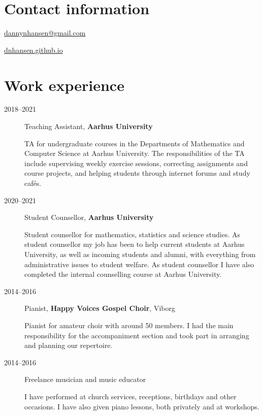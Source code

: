 \documentclass[article, a4paper, 11pt, oneside]{memoir}
\title{\doctitle}
\author{\docauthor}
\makeatletter
\newcommand{\myitem}[3]{\item[#1] #2 \par \small #3 \par\normalsize}
\renewcommand{\maketitle}{%
  \begin{center}
  {\huge\@author}\par
  \vspace*{1em}
  {\Large\itshape\@title}
  \end{center}
}
\makeatother
\begin{document}
\maketitle

\section{Contact information}

\begin{description}[itemsep=0pt]
    \item[Email] \href{mailto:dannynhansen@gmail.com}{dannynhansen@gmail.com}
    \item[Web] \href{https://dnhansen.github.io/}{dnhansen.github.io}
\end{description}


\section{Work experience}
\begin{description}
    \myitem{2018--2021}
        {Teaching Assistant, \textbf{Aarhus University}}
        {TA for undergraduate courses in the Departments of Mathematics and Computer Science at Aarhus University. The responsibilities of the TA include supervising weekly exercise sessions, correcting assignments and course projects, and helping students through internet forums and study cafés.}
    
    \myitem{2020--2021}
        {Student Counsellor, \textbf{Aarhus University}}
        {Student counsellor for mathematics, statistics and science studies. As student counsellor my job has been to help current students at Aarhus University, as well as incoming students and alumni, with everything from administrative issues to student welfare. As student counsellor I have also completed the internal counselling course at Aarhus University.}
    
    \myitem{2014--2016}
        {Pianist, \textbf{Happy Voices Gospel Choir}, Viborg}
        {Pianist for amateur choir with around 50 members. I had the main responsibility for the accompaniment section and took part in arranging and planning our repertoire.}
    
    \myitem{2014--2016}
        {Freelance musician and music educator}
        {I have performed at church services, receptions, birthdays and other occasions. I have also given piano lessons, both privately and at workshops.}
\end{description}
\end{document}
